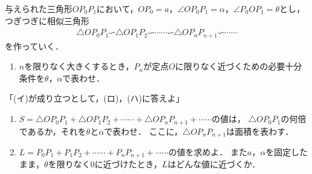 \documentclass[../../main.tex]{subfiles}
\begin{document}
与えられた三角形$OP_0P_1$において，$OP_0=a$，$\angle OP_0P_1=\alpha$，$\angle P_0OP_1=\theta$とし，つぎつぎに相似三角形
\begin{align*}
  \triangle OP_0P_1 \text{∽} \triangle OP_1P_2 \text{∽} \cdots\cdots \text{∽} \triangle OP_nP_{n+1} \text{∽} \cdots\cdots
\end{align*}
を作っていく．
\begin{enumerate}
  \item[(イ)] $n$を限りなく大きくするとき，$P_n$が定点$O$に限りなく近づくための必要十分条件を$\theta$，$\alpha$で表わせ．
\end{enumerate}
「(イ)が成り立つとして，(ロ)，(ハ)に答えよ」
\begin{enumerate}
  \item[(ロ)] $S = \triangle OP_0P_1 + \triangle OP_1P_2 + \cdots\cdots + \triangle OP_nP_{n+1} + \cdots\cdots$の値は，
    $\triangle OP_0P_1$の何倍であるか，それを$\theta$と$\alpha$で表わせ．
    ここに，$\triangle OP_nP_{n+1}$は面積を表わす．
  \item[(ハ)] $L=P_0P_1+P_1P_2+\cdots\cdots+P_nP_{n+1}+\cdots\cdots$の値を求めよ．
    また$a$，$\alpha$を固定したまま，$\theta$を限りなく0に近づけたとき，$L$はどんな値に近づくか．
\end{enumerate}
\end{document}
